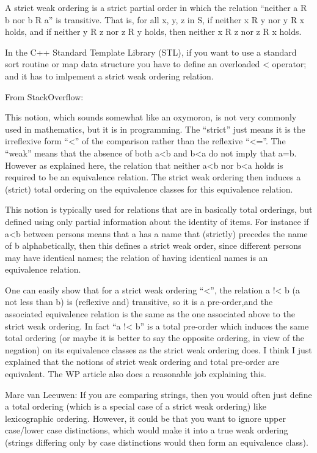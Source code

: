 \documentclass[letterpaper,10pt,english]{sphinxmanual}
\begin{document}
A strict weak ordering is a strict partial order in which the relation
“neither a R b nor b R a” is transitive. That is, for all x, y, z in
S, if neither x R y nor y R x holds, and if neither y R z nor z R y
holds, then neither x R z nor z R x holds.

In the C++ Standard Template Library (STL), if you want to use a
standard sort routine or map data structure you have to define an
overloaded \textless{} operator; and it has to imlpement a strict weak ordering
relation.

From StackOverflow:

This notion, which sounds somewhat like an oxymoron, is not very
commonly used in mathematics, but it is in programming. The “strict”
just means it is the irreflexive form “\textless{}” of the comparison rather
than the reflexive “\textless{}=”. The “weak” means that the absence of both a\textless{}b
and b\textless{}a do not imply that a=b. However as explained here, the relation
that neither a\textless{}b nor b\textless{}a holds is required to be an equivalence
relation. The strict weak ordering then induces a (strict) total
ordering on the equivalence classes for this equivalence relation.

This notion is typically used for relations that are in basically
total orderings, but defined using only partial information about the
identity of items. For instance if a\textless{}b between persons means that a
has a name that (strictly) precedes the name of b alphabetically, then
this defines a strict weak order, since different persons may have
identical names; the relation of having identical names is an
equivalence relation.

One can easily show that for a strict weak ordering “\textless{}”, the relation
a !\textless{} b (a not less than b) is (reflexive and) transitive, so it is a
pre-order,and the associated equivalence relation is the same as the
one associated above to the strict weak ordering. In fact “a !\textless{} b” is
a total pre-order which induces the same total ordering (or maybe it
is better to say the opposite ordering, in view of the negation) on
its equivalence classes as the strict weak ordering does. I think I
just explained that the notions of strict weak ordering and total
pre-order are equivalent. The WP article also does a reasonable job
explaining this.

Marc van Leeuwen: If you are comparing strings, then you would often
just define a total ordering (which is a special case of a strict weak
ordering) like lexicographic ordering. However, it could be that you
want to ignore upper case/lower case distinctions, which would make it
into a true weak ordering (strings differing only by case distinctions
would then form an equivalence class).
\end{document}
